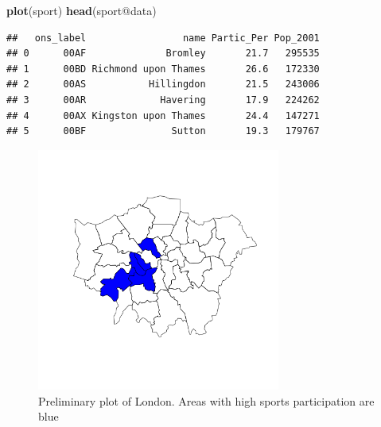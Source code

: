 \documentclass[]{article}
\newenvironment{Shaded}{}{}
\newcommand{\KeywordTok}[1]{\textcolor[rgb]{0.00,0.44,0.13}{\textbf{{#1}}}}
\newcommand{\DataTypeTok}[1]{\textcolor[rgb]{0.56,0.13,0.00}{{#1}}}
\newcommand{\DecValTok}[1]{\textcolor[rgb]{0.25,0.63,0.44}{{#1}}}
\newcommand{\StringTok}[1]{\textcolor[rgb]{0.25,0.44,0.63}{{#1}}}
\newcommand{\OtherTok}[1]{\textcolor[rgb]{0.00,0.44,0.13}{{#1}}}
\newcommand{\NormalTok}[1]{{#1}}
\let\Oldincludegraphics\includegraphics
\renewcommand{\includegraphics}[1]{\Oldincludegraphics[width=8cm]{#1}}
\begin{document}
\begin{Shaded}
\begin{Highlighting}[]
\KeywordTok{plot}\NormalTok{(sport)}
\KeywordTok{head}\NormalTok{(sport@data)}
\end{Highlighting}
\end{Shaded}
\begin{verbatim}
##   ons_label                 name Partic_Per Pop_2001
## 0      00AF              Bromley       21.7   295535
## 1      00BD Richmond upon Thames       26.6   172330
## 2      00AS           Hillingdon       21.5   243006
## 3      00AR             Havering       17.9   224262
## 4      00AX Kingston upon Thames       24.4   147271
## 5      00BF               Sutton       19.3   179767
\end{verbatim}
\begin{Shaded}
\end{Shaded}
\begin{figure}[htbp]
\centering
\includegraphics{figure/Preliminary_plot_of_London__Areas_with_high_sports_participation_are_blue.png}
\caption{Preliminary plot of London. Areas with high
sports participation are blue}
\end{figure}
\end{document}
